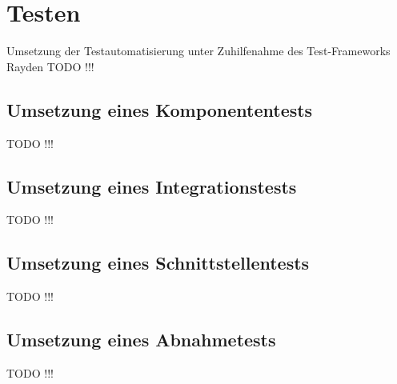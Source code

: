 ﻿\chapter{Testen}
\label{cha:Testen}

Umsetzung der Testautomatisierung unter Zuhilfenahme des Test-Frameworks Rayden
TODO !!!


\section{Umsetzung eines Komponententests }

TODO !!!

\section{Umsetzung eines Integrationstests  }

TODO !!!

\section{Umsetzung eines Schnittstellentests  }

TODO !!!

\section{Umsetzung eines Abnahmetests }

TODO !!!
